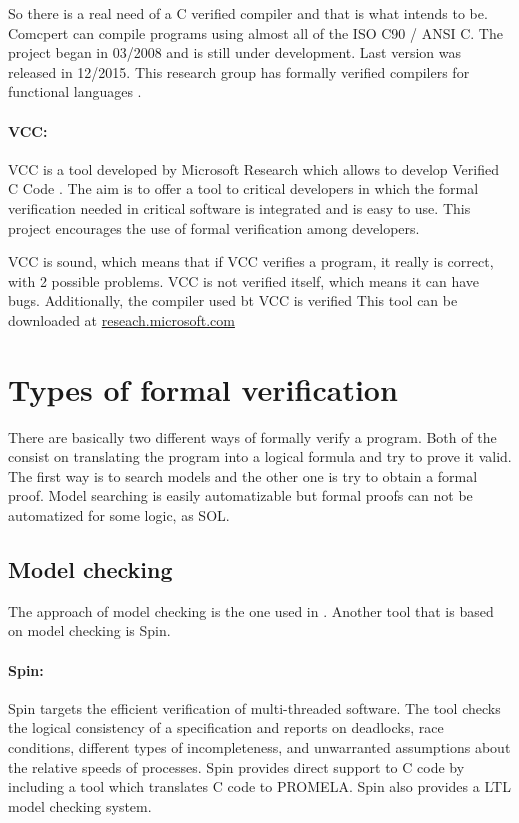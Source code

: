 So there is a real need of a C verified compiler and that is what  intends to be. 
%
Comcpert can compile programs using almost all of the ISO C90 / ANSI C.
%
The project began in 03/2008 and is still under development. Last version was released in 12/2015.
%
This research group has formally verified compilers for functional languages \cite{Dargaye-these}.


\paragraph{VCC:}
\gls{VCC} is a tool developed by Microsoft Research which allows to develop Verified C Code \cite{VCC}. 
%
The aim is to offer a tool to critical developers in which the formal verification needed in critical software is integrated and is easy to use.
%
This project encourages the use of formal verification among developers.

VCC is sound, which means that if VCC verifies a program, it really is correct, with 2 possible problems.
%
VCC is not verified itself, which means it can have bugs.
%
Additionally, the compiler used bt \gls{VCC} is verified 
%
This tool can be downloaded at \href{http://research.microsoft.com/en-us/projects/vcc/}{reseach.microsoft.com}



\section{Types of formal verification}

There are basically two different ways of formally verify a program. 
%
Both of the consist on translating the program into a logical formula and try to prove it valid.
%
The first way is to search models and the other one is try to obtain a formal proof. 
%
Model searching is easily automatizable but formal proofs can not be automatized for some logic, as \gls{SOL}.


\subsection{Model checking}

The approach of model checking is the one used in . 
%
Another tool that is based on model checking is Spin.

\paragraph{Spin:}
Spin targets the efficient verification of multi-threaded software. 
%
The tool checks the logical consistency of a specification and reports on deadlocks, race conditions, different types of incompleteness, and unwarranted assumptions about the relative speeds of processes.
%
Spin provides direct support to C code by including a tool which translates C code to \gls{PROMELA}.
%
Spin also provides a \gls{LTL} model checking system.


